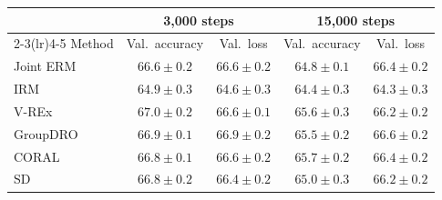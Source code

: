 \begin{tabular}{lcccc}
\toprule
 & \multicolumn{2}{c}{3{,}000 steps} & \multicolumn{2}{c}{15{,}000 steps} \\
\cmidrule(lr){2-3}\cmidrule(lr){4-5}
Method & Val.\ accuracy & Val.\ loss & Val.\ accuracy & Val.\ loss \\
\midrule
Joint ERM & $66.6\pm0.2$ & $66.6\pm0.2$ & $64.8\pm0.1$ & $66.4\pm0.2$ \\
IRM & $64.9\pm0.3$ & $64.6\pm0.3$ & $64.4\pm0.3$ & $64.3\pm0.3$ \\
V-REx & $67.0\pm0.2$ & $66.6\pm0.1$ & $65.6\pm0.3$ & $66.2\pm0.2$ \\
GroupDRO & $66.9\pm0.1$ & $66.9\pm0.2$ & $65.5\pm0.2$ & $66.6\pm0.2$ \\
CORAL & $66.8\pm0.1$ & $66.6\pm0.2$ & $65.7\pm0.2$ & $66.4\pm0.2$ \\
SD & $66.8\pm0.2$ & $66.4\pm0.2$ & $65.0\pm0.3$ & $66.2\pm0.2$ \\
\bottomrule
\end{tabular}
